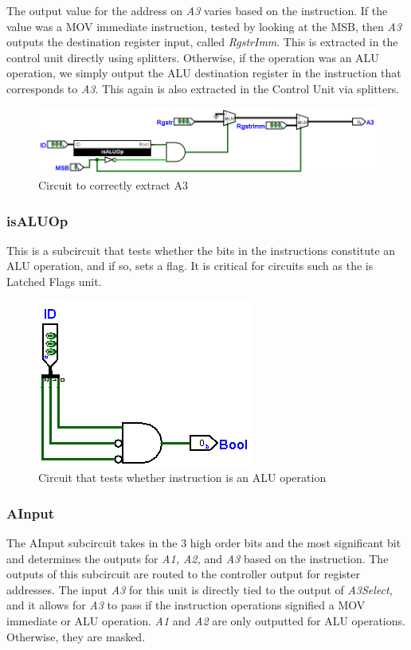 \documentclass[12pt, letter]{article}
\begin{document}
	The output value for the address on \textit{A3} varies based on the instruction. If the value was a MOV immediate instruction, tested by looking at the MSB, then \textit{A3} outputs the destination register input, called \textit{RgstrImm}. This is extracted in the control unit directly using splitters. Otherwise, if the operation was an ALU operation, we simply output the ALU destination register in the instruction that corresponds to \textit{A3}. This again is also extracted in the Control Unit via splitters.
	\newpage
	
	\begin{figure}[h]
		\centering
		\includegraphics[scale = 0.3]{A3Select}
		\caption{Circuit to correctly extract A3}
		\label{fig:A3Select}
	\end{figure}
	
	\subsubsection{isALUOp}
	This is a subcircuit that tests whether the bits in the instructions constitute an ALU operation, and if so, sets a flag. It is critical for circuits such as the is Latched Flags unit.
	
	\begin{figure}[h]
		\centering
		\includegraphics[scale = 0.3]{isALUOp}
		\caption{Circuit that tests whether instruction is an ALU operation}
		\label{fig:A3Select}
	\end{figure}

	\subsubsection{AInput}
	The AInput subcircuit takes in the 3 high order bits and the most significant bit and determines the outputs for \textit{A1, A2,} and \textit{A3} based on the instruction. The outputs of this subcircuit are routed to the controller output for register addresses. The input \textit{A3} for this unit is directly tied to the output of \textit{A3Select}, and it allows for \textit{A3} to pass if the instruction operations signified a MOV immediate or ALU operation. \textit{A1} and \textit{A2} are only outputted for ALU operations. Otherwise, they are masked.
	
\end{document}
